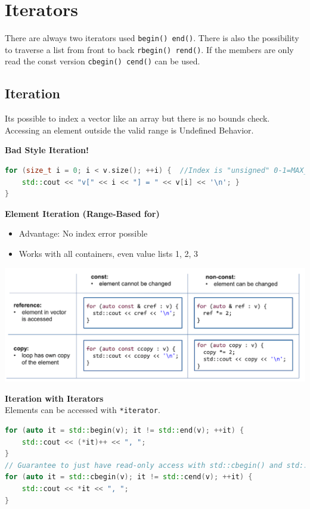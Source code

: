 
\section{Iterators}
There are always two iterators used \lstinline|begin() end()|. There is also the possibility to traverse a list from front to back \lstinline|rbegin() rend()|. If the members are only read the const version \lstinline|cbegin() cend()| can be used.

\subsection{Iteration}
Its possible to index a vector like an array but there is no bounds check.    Accessing an element outside the valid range is Undefined Behavior.

\textbf{Bad Style Iteration!}\\
\begin{lstlisting}[language=C++]
for (size_t i = 0; i < v.size(); ++i) {  //Index is "unsigned" 0-1=MAX_INT
	std::cout << "v[" << i << "] = " << v[i] << '\n'; }
}	
\end{lstlisting}

\textbf{Element Iteration (Range-Based for)}
\begin{itemize}
  \itemsep -0.5em 
  \item Advantage: No index error possible 
  \item Works with all containers, even value lists {1, 2, 3}
\end{itemize}

\begin{center}
\includegraphics[width=0.75\linewidth]{images/elementiteration}	
\end{center}

\textbf{Iteration with Iterators} \\
Elements can be accessed with \lstinline|*iterator|.
\begin{lstlisting}[language=C++]
for (auto it = std::begin(v); it != std::end(v); ++it) {
	std::cout << (*it)++ << ", "; 
}
// Guarantee to just have read-only access with std::cbegin() and std::cend()
for (auto it = std::cbegin(v); it != std::cend(v); ++it) {
	std::cout << *it << ", "; 
}
\end{lstlisting}

